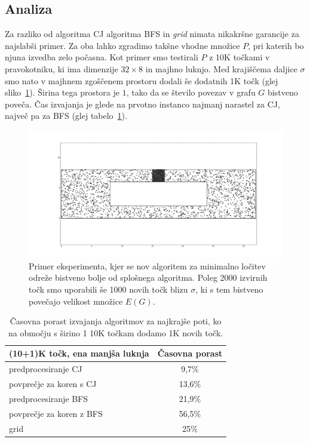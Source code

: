 \documentclass[a4paper, 12pt]{book}
\begin{document}
\subsection{Analiza}
\label{analiza}

Za razliko od algoritma CJ algoritma BFS in \textit{grid} nimata nikakršne garancije za najslabši primer. Za oba lahko zgradimo takšne vhodne množice $P$, pri katerih bo njuna izvedba zelo počasna. Kot primer smo testirali $P$ z 10K točkami v pravokotniku, ki ima dimenzije $32\times 8$ in majhno luknjo. Med krajiščema daljice $\sigma$ smo nato v majhnem zgoščenem prostoru dodali še dodatnih 1K točk (glej sliko~\ref{sep-stuffed}). Širina tega prostora je $1$, tako da se število povezav v grafu $G$ bistveno poveča. Čas izvajanja je glede na prvotno instanco najmanj narastel za CJ, največ pa za BFS (glej tabelo~\ref{table-increase}).

\begin{figure}[htp]
\centerline{\includegraphics[scale=0.3]{pics/32-1-5000-stuffed.png}}
\caption{Primer eksperimenta, kjer se nov algoritem za minimalno ločitev odreže bistveno bolje od splošnega algoritma. Poleg 2000 izvirnih točk smo uporabili še 1000 novih točk blizu $\sigma$, ki s tem bistveno povečajo velikost množice $E(G)$.}
\label{sep-stuffed}
\end{figure}

\begin{table}[htp]
\begin{center}
\begin{tabular}{l*{1}{c}}
(10+1)K točk, ena manjša luknja & \multicolumn{1}{c}{Časovna porast} \\
\hline
predprocesiranje CJ &	9,7\%		\\
povprečje za koren s CJ &	13,6\%	\\
predprocesiranje BFS & 21,9\%	\\
povprečje za koren z BFS &	56,5\% \\
grid &	25\%
\end{tabular}
\caption{Časovna porast izvajanja algoritmov za najkrajše poti, ko na območju s širino 1 10K točkam dodamo 1K novih točk.}
\label{table-increase}
\end{center}
\end{table}
\end{document}
